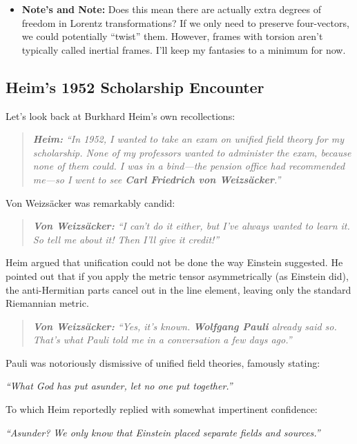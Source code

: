 \documentclass[11pt,a4paper,oneside]{article}
\newenvironment{fancyquote}
    {\begin{quote}\itshape\color{theoryblue!80!black}\guillemotleft\;}
    {\;\guillemotright\end{quote}}
\begin{document}
\begin{itemize}
    \item \textbf{Note's and Note:} Does this mean there are actually extra degrees of freedom in Lorentz transformations? If we only need to preserve four-vectors, we could potentially ``twist'' them. However, frames with torsion aren't typically called inertial frames. I'll keep my fantasies to a minimum for now.
\end{itemize}

\subsection{Heim's 1952 Scholarship Encounter}

Let's look back at Burkhard Heim's own recollections:

\begin{fancyquote}
    \textbf{Heim:} ``In 1952, I wanted to take an exam on unified field theory for my scholarship. None of my professors wanted to administer the exam, because none of them could. I was in a bind—the pension office had recommended me—so I went to see \textbf{Carl Friedrich von Weizsäcker}.''
\end{fancyquote}

Von Weizsäcker was remarkably candid:

\begin{fancyquote}
    \textbf{Von Weizsäcker:} ``I can't do it either, but I've always wanted to learn it. So tell me about it! Then I'll give it credit!''
\end{fancyquote}

Heim argued that unification could not be done the way Einstein suggested. He pointed out that if you apply the metric tensor asymmetrically (as Einstein did), the anti-Hermitian parts cancel out in the line element, leaving only the standard Riemannian metric.

\begin{fancyquote}
    \textbf{Von Weizsäcker:} ``Yes, it's known. \textbf{Wolfgang Pauli} already said so. That's what Pauli told me in a conversation a few days ago.''
\end{fancyquote}

Pauli was notoriously dismissive of unified field theories, famously stating:
\begin{center}
    \textit{``What God has put asunder, let no one put together.''}
\end{center}

To which Heim reportedly replied with somewhat impertinent confidence:
\begin{center}
    \textit{``Asunder? We only know that Einstein placed separate fields and sources.''}
\end{center}
\end{document}
